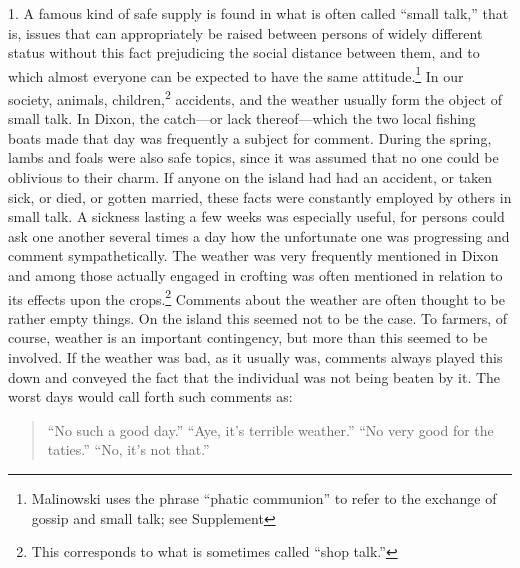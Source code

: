 \documentclass[twoside,symmetric,nobib,justified]{tufte-book}
\begin{document}
1. A famous kind of safe supply is found in what is often called ``small
talk,'' that is, issues that can appropriately be raised between persons
of widely different status without this fact prejudicing the social
distance between them, and to which almost everyone can be expected to
have the same attitude.\footnote{Malinowski uses the phrase ``phatic
  communion'' to refer to the exchange of gossip and small talk; see
  Supplement} In our society, animals, children,\textsuperscript{2} accidents, and the
weather usually form the object of small talk. In Dixon, the catch---or
lack thereof---which the two local fishing boats made that day was
frequently a subject for comment. During the spring, lambs and foals
were also safe topics, since it was assumed that no one could be
oblivious to their charm. If anyone on the island had had an accident,
or taken sick, or died, or gotten married, these facts were constantly
employed by others in small talk. A sickness lasting a few weeks was
especially useful, for persons could ask one another several times a day
how the unfortunate one was progressing and comment sympathetically. The
weather was very frequently mentioned in Dixon and among those actually
engaged in crofting was often mentioned in relation to its effects upon
the crops.\footnote{This corresponds to what is sometimes called ``shop
  talk.''} Comments about the weather are often thought to be rather
empty things. On the island this seemed not to be the case. To farmers,
of course, weather is an important contingency, but more than this
seemed to be involved. If the weather was bad, as it usually was,
comments always played this down and conveyed the fact that the
individual was not being beaten by it. The worst days would call forth
such comments as:

\begin{quote}
``No such a good day.'' ``Aye, it's terrible weather.'' ``No very good
for the taties.'' ``No, it's not that.''
\end{quote}
\end{document}
